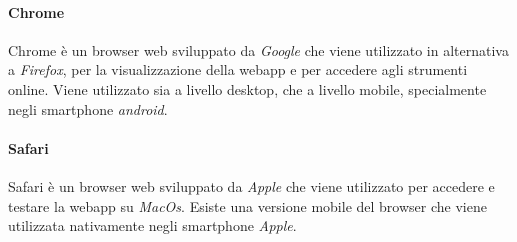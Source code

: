 				\paragraph{Chrome} 
					Chrome è un browser web sviluppato da \textit{Google} che viene utilizzato in alternativa a \textit{Firefox}, per la visualizzazione della webapp e per accedere agli strumenti online. Viene utilizzato sia a livello desktop, che a livello mobile, specialmente negli smartphone \textit{android}.

				\paragraph{Safari} 
					Safari è un browser web sviluppato da \textit{Apple} che viene utilizzato per accedere e testare la webapp su \textit{MacOs}. Esiste una versione mobile del browser che viene utilizzata nativamente negli smartphone \textit{Apple}.